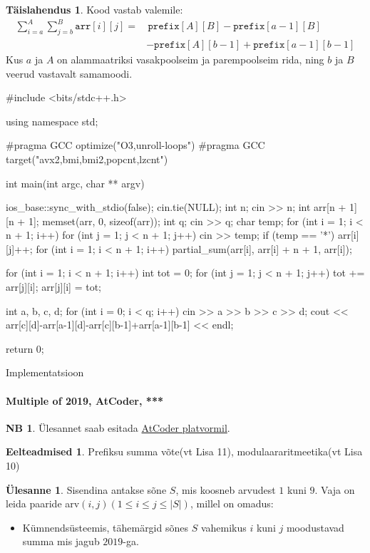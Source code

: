 \documentclass{trkut}
\theoremstyle{definition}
\newtheorem*{prereq}{Eelteadmised}
\newtheorem*{extra}{NB}
\newtheorem*{solution}{Täislahendus}
\newtheorem*{Text}{Ülesanne}
\begin{document}
\begin{solution}
Kood vastab valemile:
$$
\begin{aligned}
\sum_{i=a}^{A} \sum_{j=b}^{B} \texttt{arr}[i][j]=&\,\texttt{prefix}[A][B]
		- \texttt{prefix}[a-1][B] \\
		&- \texttt{prefix}[A][b-1] + \texttt{prefix}[a-1][b-1]
\end{aligned}
$$
Kus $a$ ja $A$ on alammaatriksi vasakpoolseim ja parempoolseim rida, ning $b$ ja $B$ veerud vastavalt samamoodi.
\end{solution}
\begin{cclol}
#include <bits/stdc++.h>

using namespace std;

#pragma GCC optimize("O3,unroll-loops")
#pragma GCC target("avx2,bmi,bmi2,popcnt,lzcnt")

int main(int argc, char ** argv) {
  ios_base::sync_with_stdio(false);
  cin.tie(NULL);
  int n;
  cin >> n;
  int arr[n + 1][n + 1];
  memset(arr, 0, sizeof(arr));
  int q;
  cin >> q;
  char temp;
  for (int i = 1; i < n + 1; i++) {
    for (int j = 1; j < n + 1; j++) {
      cin >> temp;
      if (temp == '*') arr[i][j]++;
    }
  }
  for (int i = 1; i < n + 1; i++) {
    partial_sum(arr[i], arr[i] + n + 1, arr[i]);
  }

  for (int i = 1; i < n + 1; i++) {
    int tot = 0;
    for (int j = 1; j < n + 1; j++) {
      tot += arr[j][i];
      arr[j][i] = tot;
    }
  }

  int a, b, c, d;
  for (int i = 0; i < q; i++) {
    cin >> a >> b >> c >> d;
cout << arr[c][d]-arr[a-1][d]-arr[c][b-1]+arr[a-1][b-1] << endl;
  }

  return 0;
}
\end{cclol}
\begin{kk}[H]
\caption{Implementatsioon}%
\end{kk}

\paragraph{Multiple of 2019, AtCoder, ***}
\begin{extra}
Ülesannet saab esitada \href{https://atcoder.jp/contests/abc164/tasks/abc164_d}{AtCoder platvormil}.
\end{extra}
\begin{prereq}
Prefiksu summa võte(vt Lisa 11), modulaararitmeetika(vt Lisa 10)
\end{prereq}
\begin{Text}
Sisendina antakse sõne $S$, mis koosneb arvudest $1$ kuni $9$.
Vaja on leida paaride arv$(i,j)$$(1\le i\le j\le |S|)$, millel on omadus:
\begin{itemize}
    \item Kümnendsüsteemis, tähemärgid sõnes $S$ vahemikus $i$ kuni $j$  moodustavad summa mis jagub $2019$-ga.
\end{itemize}

\parencite{16}
\end{Text}
\end{document}
